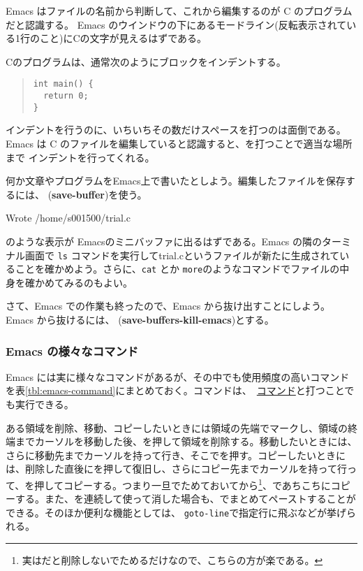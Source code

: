 Emacs はファイルの名前から判断して、これから編集するのが C のプログラムだと認識する。
Emacs のウインドウの下にあるモードライン(反転表示されている1行のこと)にCの文字が見えるはずである。

Cのプログラムは、通常次のようにブロックをインデントする。
\begin{quote}
\begin{verbatim}
int main() {
  return 0;
}
\end{verbatim}
\end{quote}
インデントを行うのに、いちいちその数だけスペースを打つのは面倒である。Emacs は C のファイルを編集していると認識すると、を打つことで適当な場所まで
インデントを行ってくれる。

何か文章やプログラムをEmacs上で書いたとしよう。編集したファイルを保存するには、  ({\bf save-buffer})を使う。
\begin{commandline2}
Wrote /home/s001500/trial.c
\end{commandline2} \noindent
のような表示が Emacsのミニバッファに出るはずである。Emacs の隣のターミナル画面で {\tt ls} コマンドを実行してtrial.cというファイルが新たに生成されていることを確かめよう。さらに、{\tt cat} とか {\tt more}のようなコマンドでファイルの中身を確かめてみるのもよい。

さて、Emacs での作業も終ったので、Emacs から抜け出すことにしよう。Emacs から抜けるには、  ({\bf save-buffers-kill-emacs})とする。

\subsubsection{Emacs の様々なコマンド}
Emacs には実に様々なコマンドがあるが、その中でも使用頻度の高いコマンドを表\ref{tbl:emacs-command}にまとめておく。コマンドは、\ \underline{コマンド}と打つことでも実行できる。

ある領域を削除、移動、コピーしたいときには領域の先端でマークし、領域の終端までカーソルを移動した後、を押して領域を削除する。移動したいときには、さらに移動先までカーソルを持って行き、そこでを押す。コピーしたいときには、削除した直後にを押して復旧し、さらにコピー先までカーソルを持って行って、を押してコピーする。つまり一旦でためておいてから\footnote{実はだと削除しないでためるだけなので、こちらの方が楽である。}、であちこちにコピーする。また、を連続して使って消した場合も、でまとめてペーストすることができる。そのほか便利な機能としては、 {\tt goto-line}で指定行に飛ぶなどが挙げられる。


